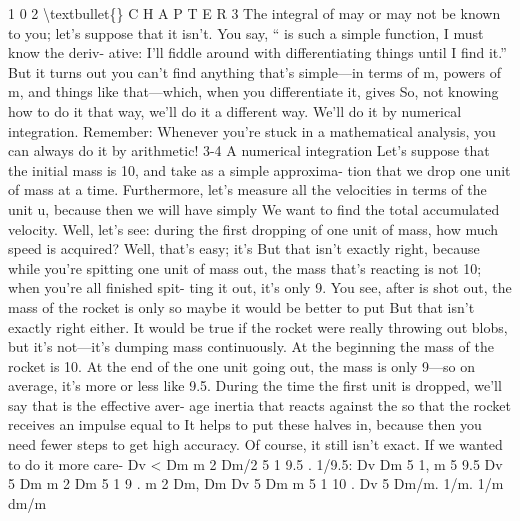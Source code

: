 \documentclass[10pt,oneside]{article}
\begin{document}
1 0 2 \textbackslash{}textbullet\{\} C H A P T E R  3 The integral of may or may not be known to you; let’s suppose that it isn’t. You say, “ is such a simple function, I must know the deriv- ative: I’ll fiddle around with differentiating things until I find it.” But it turns out you can’t find anything that’s simple---in terms of m, powers of m, and things like that---which, when you differentiate it, gives So, not knowing how to do it that way, we’ll do it a different way. We’ll do it by numerical integration. Remember: Whenever you’re stuck in a mathematical analysis, you can always do it by arithmetic! 3-4 A numerical integration Let’s suppose that the initial mass is 10, and take as a simple approxima- tion that we drop one unit of mass at a time. Furthermore, let’s measure all the velocities in terms of the unit u, because then we will have simply We want to find the total accumulated velocity. Well, let’s see: during the first dropping of one unit of mass, how much speed is acquired? Well, that’s easy; it’s But that isn’t exactly right, because while you’re spitting one unit of mass out, the mass that’s reacting is not 10; when you’re all finished spit- ting it out, it’s only 9. You see, after is shot out, the mass of the rocket is only so maybe it would be better to put But that isn’t exactly right either. It would be true if the rocket were really throwing out blobs, but it’s not---it’s dumping mass continuously. At the beginning the mass of the rocket is 10. At the end of the one unit going out, the mass is only 9---so on average, it’s more or less like 9.5. During the time the first unit is dropped, we’ll say that is the effective aver- age inertia that reacts against the so that the rocket receives an impulse equal to It helps to put these halves in, because then you need fewer steps to get high accuracy. Of course, it still isn’t exact. If we wanted to do it more care- Dv < Dm m 2 Dm/2 5 1 9.5 . 1/9.5: Dv Dm 5 1, m 5 9.5 Dv 5 Dm m 2 Dm 5 1 9 . m 2 Dm, Dm Dv 5 Dm m 5 1 10 . Dv 5 Dm/m. 1/m. 1/m dm/m\par
\end{document}
